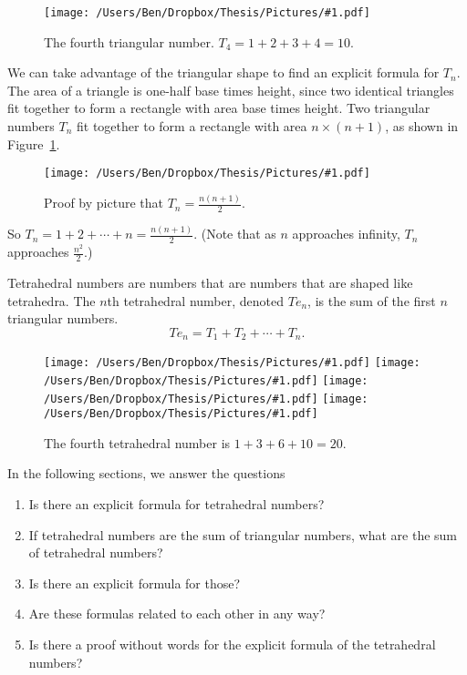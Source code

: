 \documentclass[12pt]{scrippsthesis}
\newcommand{\pic}[2]{\texttt{[image: /Users/Ben/Dropbox/Thesis/Pictures/\#1.pdf]}}
\theoremstyle{definition}
\theoremstyle{remark}
\theoremstyle{plain}
\begin{document}
\begin{figure}[H]
\centerline{\hfill
\pic{numtri}{scale=.5}\hfill
}
\caption{ The fourth triangular number. $T_4=1+2+3+4=10$. }
\end{figure}

We can take advantage of the triangular shape to find an explicit formula for $T_n$.  The area of a triangle is one-half base times height, since two identical triangles fit together to form a rectangle with area base times height.  Two triangular numbers $T_n$ fit together to form a rectangle with area $n \times (n+1) $, as shown in Figure~\ref{fig:proofbypicture}.

\begin{figure}[H]
\centerline{\hfill
\pic{sq4by5}{scale=.5}\hfill
}
\caption{ Proof by picture that $T_n = \frac{n(n+1)}{2}$.}
\label{fig:proofbypicture}
\end{figure}

So $T_n = 1 + 2 + \dotsb + n = \frac{n(n+1)}{2}$.  (Note that as $n$ approaches infinity, $T_n$ approaches $\frac{n^2}{2}$.)

Tetrahedral numbers are numbers that are numbers that are shaped like tetrahedra.  The $n$th tetrahedral number, denoted $Te_n$, is the sum of the first $n$ triangular numbers.
\begin{equation}Te_n = T_1 + T_2 + \dotsb + T_n. \end{equation}



\begin{figure}[H]
\centerline{\hfill
\pic{numstack1}{scale=.4}\hfill
\pic{numstack2}{scale=.4}\hfill
\pic{numstack3}{scale=.4}\hfill
\pic{numstack4}{scale=.4}\hfill
}
\caption{ The fourth tetrahedral number is $1+3+6+10=20$. }
\end{figure}


In the following sections, we answer the questions
\begin{enumerate}
\item Is there an explicit formula for tetrahedral numbers?
\item If tetrahedral numbers are the sum of triangular numbers, what are the sum of tetrahedral numbers?
\item Is there an explicit formula for those?
\item Are these formulas related to each other in any way?
\item Is there a proof without words for the explicit formula of the tetrahedral numbers?
\end{enumerate}
\end{document}
